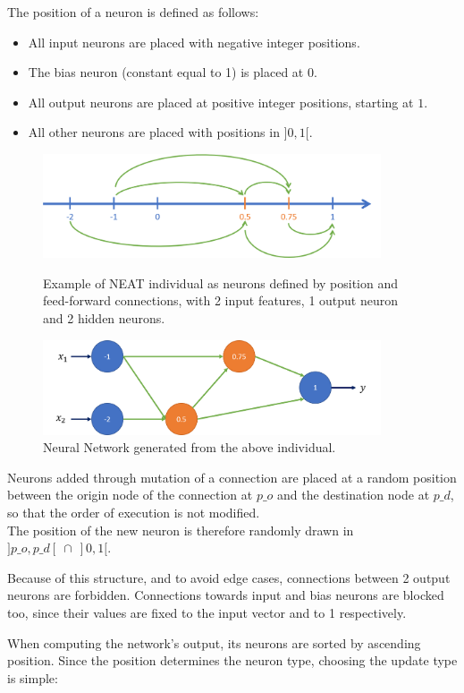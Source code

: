 The position of a neuron is defined as follows:
\begin{itemize}
    \item All input neurons are placed with negative integer positions.  
    \item The bias neuron (constant equal to 1) is placed at $0$.  
    \item All output neurons are placed at positive integer positions, starting at $1$.
    \item All other neurons are placed with positions in $]0, 1[$.
\end{itemize}

\begin{figure}[H]
\centering
\captionsetup{justification=centering,margin=2cm}
\includegraphics[width=10cm]{images/NEAT_position.png}
\caption{Example of NEAT individual as neurons defined by position and feed-forward connections, with 2 input features, 1 output neuron and 2 hidden neurons.}
\includegraphics[width=10cm]{images/NEAT_network.png}
\caption{Neural Network generated from the above individual.}
 \label{NEAT_network}
\end{figure}

Neurons added through mutation of a connection are placed at a random position between the origin node of the connection at $p\_o$ and the destination node at $p\_d$, so that the order of execution is not modified. \\
The position of the new neuron is therefore randomly drawn in $]p\_o, p\_d[ \: \cap \: ]0, 1[$.

Because of this structure, and to avoid edge cases, connections between 2 output neurons are forbidden. Connections towards input and bias neurons are blocked too, since their values are fixed to the input vector and to 1 respectively.

When computing the network's output, its neurons are sorted by ascending position. Since the position determines the neuron type, choosing the update type is simple:

